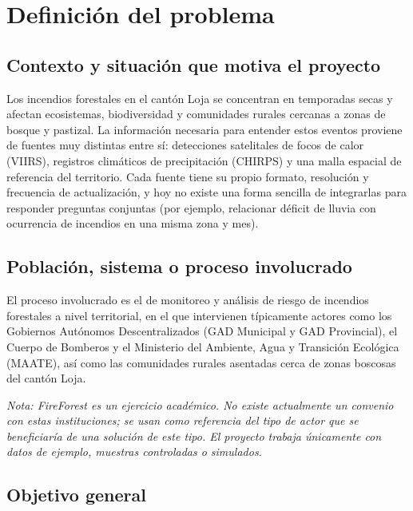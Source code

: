 \documentclass[11pt,a4paper]{article}
\begin{document}
\section{Definici\'on del problema}

\subsection{Contexto y situaci\'on que motiva el proyecto}

Los incendios forestales en el cant\'on Loja se concentran en temporadas secas y afectan ecosistemas, biodiversidad y comunidades rurales cercanas a zonas de bosque y pastizal. La informaci\'on necesaria para entender estos eventos proviene de fuentes muy distintas entre s\'i: detecciones satelitales de focos de calor (VIIRS), registros clim\'aticos de precipitaci\'on (CHIRPS) y una malla espacial de referencia del territorio. Cada fuente tiene su propio formato, resoluci\'on y frecuencia de actualizaci\'on, y hoy no existe una forma sencilla de integrarlas para responder preguntas conjuntas (por ejemplo, relacionar d\'eficit de lluvia con ocurrencia de incendios en una misma zona y mes).

\subsection{Poblaci\'on, sistema o proceso involucrado}

El proceso involucrado es el de monitoreo y an\'alisis de riesgo de incendios forestales a nivel territorial, en el que intervienen t\'ipicamente actores como los Gobiernos Aut\'onomos Descentralizados (GAD Municipal y GAD Provincial), el Cuerpo de Bomberos y el Ministerio del Ambiente, Agua y Transici\'on Ecol\'ogica (MAATE), as\'i como las comunidades rurales asentadas cerca de zonas boscosas del cant\'on Loja.

\textit{Nota: FireForest es un ejercicio acad\'emico. No existe actualmente un convenio con estas instituciones; se usan como referencia del tipo de actor que se beneficiar\'ia de una soluci\'on de este tipo. El proyecto trabaja \'unicamente con datos de ejemplo, muestras controladas o simulados.}

\subsection{Objetivo general}
\end{document}
